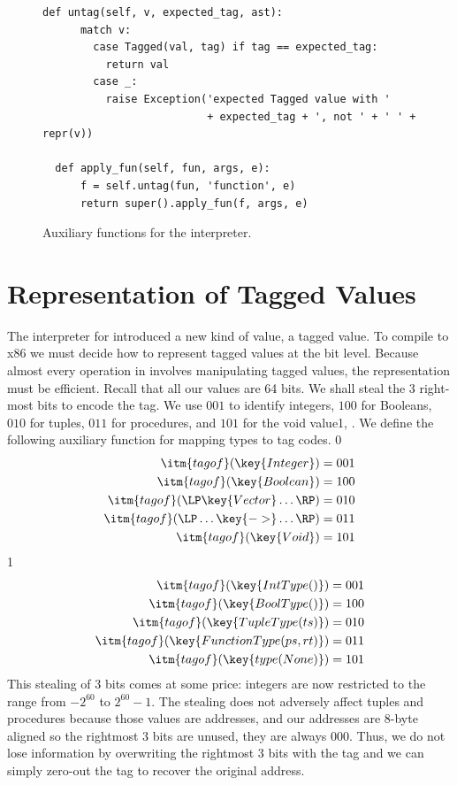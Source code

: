 \documentclass[7x10]{TimesAPriori_MIT}%
\def\racketEd{0}
\def\pythonEd{1}
\def\edition{0}
\newcommand{\python}[1]{{\if\edition\pythonEd #1\fi}}
\numberwithin{theorem}{chapter}
\numberwithin{definition}{chapter}
\numberwithin{equation}{chapter}
\begin{document}
\begin{figure}[tbp]
\begin{tcolorbox}[colback=white]
{\begin{lstlisting}[basicstyle=\ttfamily\footnotesize]
  def untag(self, v, expected_tag, ast):
      match v:
        case Tagged(val, tag) if tag == expected_tag:
          return val
        case _:
          raise Exception('expected Tagged value with '
                          + expected_tag + ', not ' + ' ' + repr(v))

  def apply_fun(self, fun, args, e):
      f = self.untag(fun, 'function', e)
      return super().apply_fun(f, args, e)
\end{lstlisting}
\fi}
  \end{tcolorbox}

  \caption{Auxiliary functions for the \LangDyn{} interpreter.}
\label{fig:interp-Ldyn-aux}
\end{figure}

\clearpage

\section{Representation of Tagged Values}

The interpreter for \LangDyn{} introduced a new kind of value, a tagged
value. To compile \LangDyn{} to x86 we must decide how to represent tagged
values at the bit level. Because almost every operation in \LangDyn{}
involves manipulating tagged values, the representation must be
efficient. Recall that all our values are 64 bits.  We shall steal
the 3 right-most bits to encode the tag.  We use $001$ to identify
integers, $100$ for Booleans, $010$ for tuples, $011$ for procedures,
and $101$ for the void value\python{, }. We define the following auxiliary
function for mapping types to tag codes.
{\if\edition\racketEd
\begin{align*}
\itm{tagof}(\key{Integer}) &= 001 \\
\itm{tagof}(\key{Boolean}) &= 100 \\
\itm{tagof}(\LP\key{Vector} \ldots\RP) &= 010 \\
\itm{tagof}(\LP\ldots \key{->} \ldots\RP) &= 011 \\
\itm{tagof}(\key{Void}) &= 101
\end{align*}
\fi}
{\if\edition\pythonEd
\begin{align*}
\itm{tagof}(\key{IntType()}) &= 001 \\
\itm{tagof}(\key{BoolType()}) &= 100 \\
\itm{tagof}(\key{TupleType(ts)}) &= 010 \\
\itm{tagof}(\key{FunctionType(ps, rt)}) &= 011 \\
\itm{tagof}(\key{type(None)}) &= 101
\end{align*}
\fi}
This stealing of 3 bits comes at some price: integers are now restricted
to the range from $-2^{60}$ to $2^{60}-1$. The stealing does not adversely
affect tuples and procedures because those values are addresses, and
our addresses are 8-byte aligned so the rightmost 3 bits are unused,
they are always $000$. Thus, we do not lose information by overwriting
the rightmost 3 bits with the tag and we can simply zero-out the tag
to recover the original address.
\end{document}
